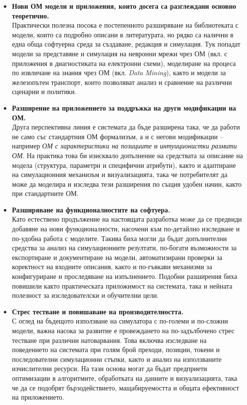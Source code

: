 \begin{itemize}
    \item \textbf{Нови ОМ модели и приложения, които досега са разглеждани основно теоретично.}\\
    Практически полезна посока е постепенното разширяване на библиотеката с модели, които са подробно описани в литературата, но рядко са налични в една обща софтуерна среда за създаване, редакция и симулация. Тук попадат модели за представяне и симулация на невронни мрежи чрез ОМ (вкл. с приложения в диагностиката на електронни схеми), моделиране на процеса по извличане на знания чрез ОМ (вкл. \textit{Data Mining}), както и модели за железопътен транспорт, които позволяват анализ и сравнение на различни сценарии и политики. \cite{Sotirov06,Bureva14,Popov20,Boyukov23}
	\newpage
    \item \textbf{Разширение на приложението за поддръжка на други модификации на ОМ.}\\
    Друга перспективна линия е системата да бъде разширена така, че да работи не само със стандартния ОМ формализъм, а и с негови модификации – например \emph{ОМ с характеристики на позициите} и \emph{интуиционистки размити ОМ}. На практика това би изисквало допълнение на средствата за описание на модела (структура, параметри и специфични атрибути), както и адаптиране на симулационния механизъм и визуализацията, така че потребителят да може да моделира и изследва тези разширения по същия удобен начин, както при стандартните ОМ. \cite{Andonov15,Atanassova13}

    \item \textbf{Разширяване на функционалностите на софтуера.}\\
    Като естествено продължение на настоящата разработка може да се предвиди добавяне на нови функционалности, насочени към по-детайлно изследване и по-удобна работа с моделите. Такива биха могли да бъдат допълнителни средства за анализ на симулационните резултати, по-богати възможности за експортиране и документиране на модели, автоматизирани проверки за коректност на входните описания, както и по-гъвкави механизми за конфигуриране и проследяване на изпълнението. Подобни разширения биха повишили както практическата приложимост на системата, така и нейната полезност за изследователски и обучителни цели.

    \item \textbf{Стрес тестване и повишаване на производителността.}\\
    С оглед на бъдещото използване на симулатора с по-големи и по-сложни модели, важна насока за развитие е провеждането на по-задълбочено стрес тестване при различни натоварвания. Това включва изследване на поведението на системата при голям брой преходи, позиции, токени и последователни симулационни стъпки, както и анализ на използваните изчислителни ресурси. На тази основа могат да бъдат предприети оптимизации в алгоритмите, обработката на данните и визуализацията, така че да се подобрят бързодействието, мащабируемостта и общата ефективност на приложението.


\end{itemize}
